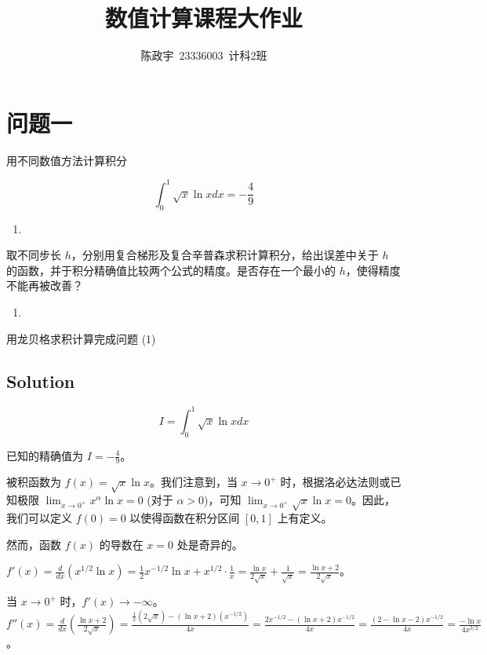 \documentclass[11pt]{article}
\title{数值计算课程大作业}
\author{陈政宇\ 23336003\ 计科2班}
\providecommand{\tightlist}{%
      \setlength{\itemsep}{0pt}\setlength{\parskip}{0pt}}
\begin{document}
    
    \maketitle
    \tableofcontents
    \newpage %
    

    
    \section{问题一}\label{ux95eeux9898ux4e00}

用不同数值方法计算积分

\[
\int_0^1 \sqrt x\ln x dx = -\frac{4}{9}
\]

\begin{enumerate}
\def\labelenumi{(\arabic{enumi})}
\tightlist
\item
\end{enumerate}

取不同步长 \(h\)，分别用复合梯形及复合辛普森求积计算积分，给出误差中关于
\(h\) 的函数，并于积分精确值比较两个公式的精度。是否存在一个最小的
\(h\)，使得精度不能再被改善？

\begin{enumerate}
\def\labelenumi{(\arabic{enumi})}
\setcounter{enumi}{1}
\tightlist
\item
\end{enumerate}

用龙贝格求积计算完成问题 (1)

    \subsection{Solution}\label{solution}

\[ I = \int_0^1 \sqrt x\ln x dx \]

已知的精确值为 \(I = -\frac{4}{9}\)。

被积函数为 \(f(x) = \sqrt x \ln x\)。我们注意到，当 \(x \to 0^+\)
时，根据洛必达法则或已知极限 \(\lim_{x\to 0^+} x^\alpha \ln x = 0\)
(对于 \(\alpha > 0\))，可知
\(\lim_{x\to 0^+} \sqrt x \ln x = 0\)。因此，我们可以定义 \(f(0)=0\)
以使得函数在积分区间 \([0,1]\) 上有定义。

然而，函数 \(f(x)\) 的导数在 \(x=0\) 处是奇异的。

\(f'(x) = \frac{d}{dx}(x^{1/2} \ln x) = \frac{1}{2}x^{-1/2}\ln x + x^{1/2} \cdot \frac{1}{x} = \frac{\ln x}{2\sqrt{x}} + \frac{1}{\sqrt{x}} = \frac{\ln x + 2}{2\sqrt{x}}\)。

当 \(x \to 0^+\) 时，\(f'(x) \to -\infty\)。
\(f''(x) = \frac{d}{dx}\left(\frac{\ln x + 2}{2\sqrt{x}}\right) = \frac{\frac{1}{x}(2\sqrt{x}) - (\ln x + 2)(x^{-1/2})}{4x} = \frac{2x^{-1/2} - (\ln x + 2)x^{-1/2}}{4x} = \frac{(2 - \ln x - 2)x^{-1/2}}{4x} = \frac{-\ln x}{4x^{3/2}}\)。
\end{document}
